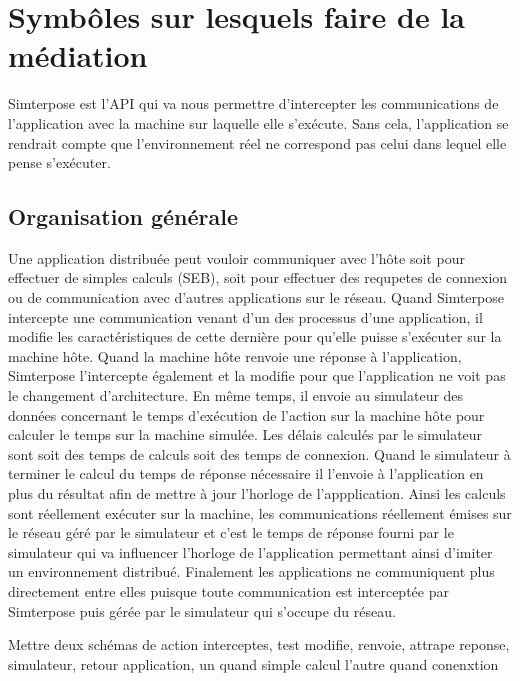 \section{Symbôles sur lesquels faire de la médiation}
Simterpose est l'API qui va nous permettre d'intercepter les communications de
l'application avec la machine sur laquelle elle s'exécute. Sans cela,
l'application se rendrait compte que l'environnement réel ne correspond pas
celui dans lequel elle pense s'exécuter.

\subsection{Organisation générale}
 Une application distribuée peut vouloir communiquer avec l'hôte soit pour
 effectuer de simples calculs (SEB), soit pour effectuer des requpetes de
 connexion ou de communication avec d'autres applications sur le réseau. Quand
 Simterpose intercepte une communication venant d'un des processus d'une
 application, il modifie les caractéristiques de cette dernière pour qu'elle
 puisse s'exécuter sur la machine hôte. Quand la machine hôte renvoie une
 réponse à l'application, Simterpose l'intercepte également et la modifie pour
 que l'application ne voit pas le changement d'architecture. En même temps, il
 envoie au simulateur des données concernant le temps d'exécution de l'action
 sur la machine hôte pour calculer le temps sur la machine simulée. Les délais
 calculés par le simulateur sont soit des temps de calculs soit des temps de
 connexion. Quand le simulateur à terminer le calcul du temps de réponse
 nécessaire il l'envoie à l'application en plus du résultat afin de mettre à
 jour l'horloge de l'appplication. Ainsi les calculs sont réellement exécuter
 sur la machine, les communications réellement émises sur le réseau géré par le
 simulateur et c'est le temps de réponse fourni par le simulateur qui va
 influencer l'horloge de l'application permettant ainsi d'imiter un
 environnement distribué. Finalement les applications ne communiquent plus
 directement entre elles puisque toute communication est interceptée par
 Simterpose puis gérée par le simulateur qui s'occupe du réseau.

{\color{red} Mettre deux schémas de action interceptes, test modifie, renvoie,
  attrape reponse, simulateur, retour application, un quand simple calcul l'autre quand conenxtion}

